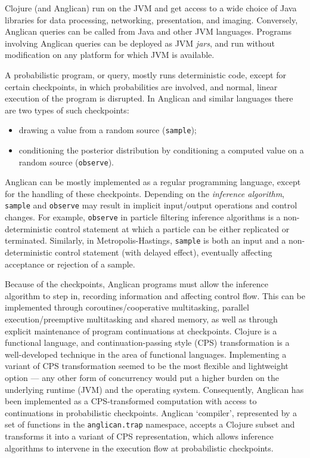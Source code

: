 \documentclass[preprint]{sigplanconf}
\begin{document}
Clojure (and Anglican) run on the JVM and get access to a wide choice of Java
libraries for data processing, networking, presentation, and imaging.
Conversely, Anglican queries can be called from Java and other JVM languages.
Programs involving Anglican queries can be deployed as JVM
\textit{jars}, and run without modification on any platform for 
which JVM is available.

A probabilistic program, or query, mostly runs deterministic
code, except for certain checkpoints, in which probabilities are
involved, and normal, linear execution of the program is
disrupted. In Anglican and similar languages there are two
types of such checkpoints:
\begin{itemize}
    \item drawing a value from a random source (\texttt{sample});
    \item conditioning the posterior distribution by
        conditioning a computed value on a random source
        (\texttt{observe}).
\end{itemize}

Anglican can be mostly implemented as a regular programming
language, except for the handling of these checkpoints.
Depending on the \textit{inference algorithm}, \texttt{sample}
and \texttt{observe} may result in implicit input/output
operations and control changes. For example, \texttt{observe} in
particle filtering inference algorithms is a non-deterministic
control statement at which a particle can be either replicated
or terminated. Similarly, in Metropolis-Hastings,
\texttt{sample} is both an input and a non-deterministic control
statement (with delayed effect), eventually affecting acceptance
or rejection of a sample.

Because of the checkpoints, Anglican programs must allow the
inference algorithm to step in, recording information and
affecting control flow. This can be implemented through
coroutines/cooperative multitasking, parallel execution/preemptive
multitasking and shared memory, as well as through explicit
maintenance of program continuations at checkpoints. Clojure is
a functional language, and continuation-passing style (CPS)
transformation is a well-developed technique in the area of
functional languages. Implementing a variant of CPS
transformation seemed to be the most flexible and lightweight
option --- any other form of concurrency would put a higher burden
on the underlying runtime (JVM) and the operating system.
Consequently, Anglican has been implemented as a CPS-transformed
computation with access to continuations in probabilistic
checkpoints. Anglican `compiler', represented by a set of
functions in the \texttt{anglican.trap} namespace, accepts a
Clojure subset and transforms it into a variant of CPS
representation, which allows inference algorithms to intervene
in the execution flow at probabilistic checkpoints.
\end{document}

